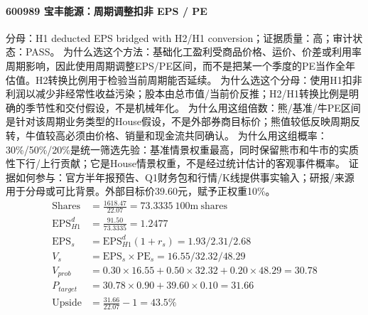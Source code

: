 \paragraph{600989 宝丰能源：周期调整扣非 EPS / PE}
分母：H1 deducted EPS bridged with H2/H1 conversion；证据质量：高；审计状态：PASS。
为什么选这个方法：基础化工盈利受商品价格、运价、价差或利用率周期影响，因此使用周期调整EPS/PE区间，而不是把某一个季度的PE当作全年估值。H2转换比例用于检验当前周期能否延续。
为什么选这个分母：使用H1扣非利润以减少非经常性收益污染；股本由总市值/当前价反推；H2/H1转换比例是明确的季节性和交付假设，不是机械年化。
为什么用这组倍数：熊/基准/牛PE区间是针对该周期业务类型的House假设，不是外部券商目标价；熊值较低反映周期反转，牛值较高必须由价格、销量和现金流共同确认。
为什么用这组概率：30\%/50\%/20\%是统一筛选先验：基准情景权重最高，同时保留熊市和牛市的实质性下行/上行贡献；它是House情景权重，不是经过统计估计的客观事件概率。
证据如何参与：官方半年报预告、Q1财务包和行情/K线提供事实输入；研报/来源用于分母或可比背景。外部目标价39.60元，赋予正权重10\%。
\begin{align*}
\mathrm{Shares} &= \frac{1618.47}{22.07}=73.3335\ \mathrm{100m\ shares}\\
\mathrm{EPS}_{H1}^d &= \frac{91.50}{73.3335}=1.2477\\
\mathrm{EPS}_s &= \mathrm{EPS}_{H1}^d(1+r_s)=1.93/2.31/2.68\\
V_s &= \mathrm{EPS}_s\times \mathrm{PE}_s=16.55/32.32/48.29\\
V_{prob} &= 0.30\times 16.55+0.50\times 32.32+0.20\times 48.29=30.78\\
P_{target} &= 30.78\times 0.90+39.60\times 0.10=31.66\\
\mathrm{Upside} &= \frac{31.66}{22.07}-1=43.5\%\\
\end{align*}

